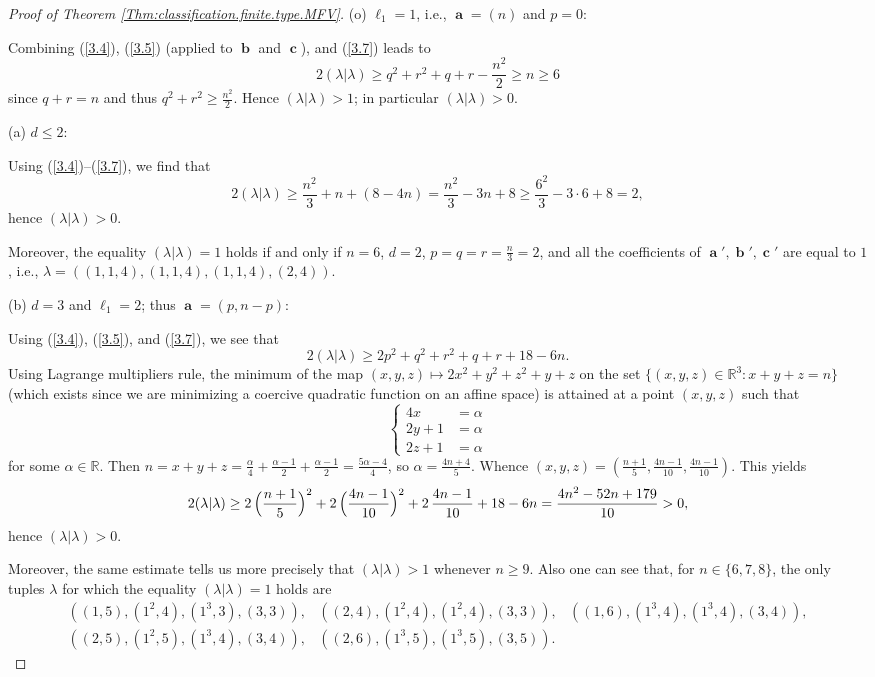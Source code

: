 \documentclass[12pt,reqno]{amsart}
\begin{document}
\begin{proof}[Proof  of Theorem \ref{Thm:classification.finite.type.MFV}]
\bigskip
\noindent
(o) $\ell_1=1$, i.e., $\mbfa=(n)$ and $p=0$:

Combining (\ref{3.4}), (\ref{3.5}) (applied to $\mbfb$ and $\mbfc$), and (\ref{3.7}) leads to
$$
2(\lambda|\lambda)\geq q^2+r^2+q+r-\frac{n^2}{2}\geq n\geq 6
$$
since $q+r=n$ and thus $q^2+r^2\geq \frac{n^2}{2}$.
Hence $(\lambda|\lambda)>1$; in particular $(\lambda|\lambda)>0$.

\bigskip
\noindent
(a) $d\leq 2$:

Using (\ref{3.4})--(\ref{3.7}), we find that
$$
2(\lambda|\lambda)\geq \frac{n^2}{3}+n+(8-4n)=\frac{n^2}{3}-3n+8\geq \frac{6^2}{3}-3\cdot 6+8=2,
$$
hence $(\lambda|\lambda)>0$.

Moreover, the equality $(\lambda|\lambda)=1$ holds if and only if
$n=6$, $d=2$, $p=q=r=\frac{n}{3}=2$, and all the coefficients of $\mbfa',\mbfb',\mbfc'$ are equal to $1$,
i.e., $\lambda=((1,1,4),(1,1,4),(1,1,4),(2,4))$.

\bigskip
\noindent
(b) $d=3$ and $\ell_1=2$; thus $\mbfa=(p,n-p)$:

Using (\ref{3.4}), (\ref{3.5}), and (\ref{3.7}), we see that
$$
2(\lambda|\lambda)\geq 2p^2+q^2+r^2+q+r+18-6n.
$$
Using Lagrange multipliers rule, the minimum of the map $(x,y,z)\mapsto 2x^2+y^2+z^2+y+z$
on the set $\{(x,y,z)\in\mathbb{R}^3:x+y+z=n\}$
(which exists since we are minimizing a coercive quadratic function on an affine space)
is attained at a point $(x,y,z)$ such that
$$
\left\{\begin{array}{ll}
4x & = \alpha \\ 2y+1 & =\alpha \\
2z+1 & =\alpha
\end{array}\right.
$$
for some $\alpha\in\mathbb{R}$.
Then $n=x+y+z=\frac{\alpha}{4}+\frac{\alpha-1}{2}+\frac{\alpha-1}{2}=\frac{5\alpha-4}{4}$, so $\alpha=\frac{4n+4}{5}$.
Whence $(x,y,z)=(\frac{n+1}{5},\frac{4n-1}{10},\frac{4n-1}{10})$. This yields
$$
2(\lambda|\lambda) \geq 2 \, \Bigl(\frac{n+1}{5}\Bigr)^2+2\, \Bigl(\frac{4n-1}{10}\Bigr)^2
+2\, \frac{4n-1}{10} + 18-6n=\frac{4n^2-52n+179}{10}>0,
$$
hence $(\lambda|\lambda)>0$.

Moreover, the same estimate tells us more precisely that
$(\lambda|\lambda)>1$ whenever $n\geq 9$. Also one can see that, for $n\in\{6,7,8\}$,
the only tuples $\lambda$ for which the equality $(\lambda|\lambda)=1$ holds
are
$$
\begin{array}{lll}
((1,5),(1^2,4),(1^3,3),(3,3)), & ((2,4),(1^2,4),(1^2,4),(3,3)), &
((1,6),(1^3,4),(1^3,4),(3,4)), \\
((2,5),(1^2,5),(1^3,4),(3,4)), &
((2,6),(1^3,5),(1^3,5),(3,5)).
\end{array}
$$


\end{proof}
\end{document}
